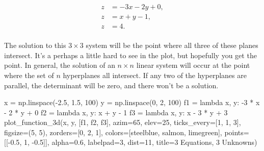 \documentclass[
  letterpaper,
  DIV=11,
  numbers=noendperiod]{scrreprt}
\newenvironment{Shaded}{\begin{snugshade}}{\end{snugshade}}
\newcommand{\DecValTok}[1]{\textcolor[rgb]{0.68,0.00,0.00}{#1}}
\newcommand{\FloatTok}[1]{\textcolor[rgb]{0.68,0.00,0.00}{#1}}
\newcommand{\KeywordTok}[1]{\textcolor[rgb]{0.00,0.23,0.31}{#1}}
\newcommand{\NormalTok}[1]{\textcolor[rgb]{0.00,0.23,0.31}{#1}}
\newcommand{\OperatorTok}[1]{\textcolor[rgb]{0.37,0.37,0.37}{#1}}
\newcommand{\StringTok}[1]{\textcolor[rgb]{0.13,0.47,0.30}{#1}}
\begin{document}
\begin{align*}
z &= -3x - 2y + 0, \\
z &= x + y - 1, \\
z &= 4 . \\
\end{align*}

The solution to this \(3 \times 3\) system will be the point where all
three of these planes intersect. It's a perhaps a little hard to see in
the plot, but hopefully you get the point. In general, the solution of
an \(n \times n\) linear system will occur at the point where the set of
\(n\) hyperplanes all intersect. If any two of the hyperplanes are
parallel, the determinant will be zero, and there won't be a solution.

\begin{Shaded}
\begin{Highlighting}[]
\NormalTok{x }\OperatorTok{=}\NormalTok{ np.linspace(}\OperatorTok{{-}}\FloatTok{2.5}\NormalTok{, }\FloatTok{1.5}\NormalTok{, }\DecValTok{100}\NormalTok{)}
\NormalTok{y }\OperatorTok{=}\NormalTok{ np.linspace(}\DecValTok{0}\NormalTok{, }\DecValTok{2}\NormalTok{, }\DecValTok{100}\NormalTok{)}
\NormalTok{f1 }\OperatorTok{=} \KeywordTok{lambda}\NormalTok{ x, y: }\OperatorTok{{-}}\DecValTok{3} \OperatorTok{*}\NormalTok{ x }\OperatorTok{{-}} \DecValTok{2} \OperatorTok{*}\NormalTok{ y }\OperatorTok{+} \DecValTok{0}
\NormalTok{f2 }\OperatorTok{=} \KeywordTok{lambda}\NormalTok{ x, y: x }\OperatorTok{+}\NormalTok{ y }\OperatorTok{{-}} \DecValTok{1}
\NormalTok{f3 }\OperatorTok{=} \KeywordTok{lambda}\NormalTok{ x, y: x }\OperatorTok{{-}} \DecValTok{3} \OperatorTok{*}\NormalTok{ y }\OperatorTok{+} \DecValTok{3}
\NormalTok{plot\_function\_3d(x, y, [f1, f2, f3], azim}\OperatorTok{=}\DecValTok{65}\NormalTok{, elev}\OperatorTok{=}\DecValTok{25}\NormalTok{, ticks\_every}\OperatorTok{=}\NormalTok{[}\DecValTok{1}\NormalTok{, }\DecValTok{1}\NormalTok{, }\DecValTok{3}\NormalTok{], figsize}\OperatorTok{=}\NormalTok{(}\DecValTok{5}\NormalTok{, }\DecValTok{5}\NormalTok{), zorders}\OperatorTok{=}\NormalTok{[}\DecValTok{0}\NormalTok{, }\DecValTok{2}\NormalTok{, }\DecValTok{1}\NormalTok{],}
\NormalTok{                 colors}\OperatorTok{=}\NormalTok{[}\StringTok{\textquotesingle{}steelblue\textquotesingle{}}\NormalTok{, }\StringTok{\textquotesingle{}salmon\textquotesingle{}}\NormalTok{, }\StringTok{\textquotesingle{}limegreen\textquotesingle{}}\NormalTok{], points}\OperatorTok{=}\NormalTok{[[}\OperatorTok{{-}}\FloatTok{0.5}\NormalTok{, }\DecValTok{1}\NormalTok{, }\OperatorTok{{-}}\FloatTok{0.5}\NormalTok{]], alpha}\OperatorTok{=}\FloatTok{0.6}\NormalTok{, labelpad}\OperatorTok{=}\DecValTok{3}\NormalTok{, }
\NormalTok{                 dist}\OperatorTok{=}\DecValTok{11}\NormalTok{, title}\OperatorTok{=}\StringTok{\textquotesingle{}3 Equations, 3 Unknowns\textquotesingle{}}\NormalTok{)}
\end{Highlighting}
\end{Shaded}
\end{document}
